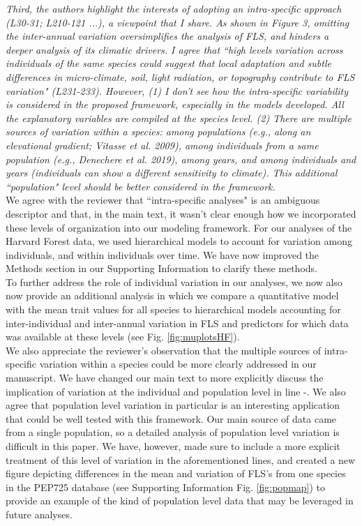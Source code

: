 \documentclass{article}[11pt]
\begin{document}
\emph{Third, the authors highlight the interests of adopting an intra-specific approach (L30-31; L210-121 ...), a viewpoint that I share. As shown in Figure 3, omitting the inter-annual variation oversimplifies the analysis of FLS, and hinders a deeper analysis of its climatic drivers. I agree that ``high levels variation across individuals of the same species could suggest that local adaptation and subtle differences in micro-climate, soil, light radiation, or topography contribute to FLS variation" (L231-233). However, (1) I don't see how the intra-specific variability is considered in the proposed framework, especially in the models developed. All the explanatory variables are compiled at the species level. (2) There are multiple sources of variation within a species: among populations (e.g., along an elevational gradient; Vitasse et al. 2009), among individuals from a same population (e.g., Denechere et al. 2019), among years, and among individuals and years (individuals can show a different sensitivity to climate). This additional ``population" level should be better considered in the framework.}\\

\noindent We agree with the reviewer that ``intra-specific analyses" is an ambiguous descriptor and that, in the main text, it wasn't clear enough how we incorporated these levels of organization into our modeling framework. For our analyses of the Harvard Forest data, we used hierarchical models to account for variation among individuals, and within individuals over time. We have now improved the Methods section in our Supporting Information to clarify these methods.\\ 

\noindent To further address the role of individual variation in our analyses, we now also now provide an additional analysis in which we compare a quantitative model with the mean trait values for all species to hierarchical models accounting for inter-individual and inter-annual variation in FLS and predictors for which data was available at these levels (see Fig.  \ref{fig:muplotsHF}).\\

\indent We also appreciate the reviewer's observation that the multiple sources of intra-specific variation within a species could be more clearly addressed in our manuscript. We have changed our main text to more explicitly discuss the implication of variation at the individual and population level in line -.  We also agree that population level variation in particular is an interesting application that could be well tested with this framework. Our main source of data came from a single population, so a detailed analysis of population level variation is difficult in this paper. We have, however, made sure to include a more explicit treatment of this level of variation in the aforementioned lines, and created a new figure depicting differences in the mean and variation of FLS's from one species in the PEP725 database (see Supporting Information Fig. \ref{fig:popmap}) to provide an example of the kind of population level data that may be leveraged in future analyses.\\
\end{document}
